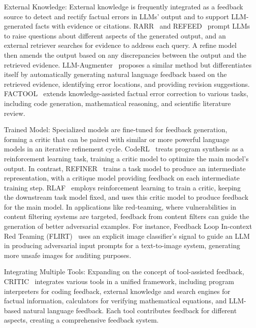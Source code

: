 \documentclass[12pt]{extarticle}
\begin{document}
External Knowledge: External knowledge is frequently integrated as a feedback source to detect and rectify factual errors in LLMs' output and to support LLM-generated facts with evidence or citations. RARR~\cite{gao2023rarr} and REFEED~\cite{yu2023improving} prompt LLMs to raise questions about different aspects of the generated output, and an external retriever searches for evidence to address each query. A refine model then amends the output based on any discrepancies between the output and the retrieved evidence. LLM-Augmenter~\cite{peng2023check} proposes a similar method but differentiates itself by automatically generating natural language feedback based on the retrieved evidence, identifying error locations, and providing revision suggestions. FACTOOL~\cite{chern2023factool} extends knowledge-assisted factual error correction to various tasks, including code generation, mathematical reasoning, and scientific literature review.

Trained Model: Specialized models are fine-tuned for feedback generation, forming a critic that can be paired with similar or more powerful language models in an iterative refinement cycle. CodeRL~\cite{le2022coderl} treats program synthesis as a reinforcement learning task, training a critic model to optimize the main model's output. In contrast, REFINER~\cite{paul2023refiner} trains a task model to produce an intermediate representation, with a critique model providing feedback on each intermediate training step. RLAF~\cite{akyurek-etal-2023-rl4f} employs reinforcement learning to train a critic, keeping the downstream task model fixed, and uses this critic model to produce feedback for the main model. In applications like red-teaming, where vulnerabilities in content filtering systems are targeted, feedback from content filters can guide the generation of better adversarial examples. For instance, Feedback Loop In-context Red Teaming (FLIRT)~\cite{mehrabi2023flirt} uses an explicit image classifier's signal to guide an LLM in producing adversarial input prompts for a text-to-image system, generating more unsafe images for auditing purposes.

Integrating Multiple Tools: Expanding on the concept of tool-assisted feedback, CRITIC~\cite{gou2023critic} integrates various tools in a unified framework, including program interpreters for coding feedback, external knowledge and search engines for factual information, calculators for verifying mathematical equations, and LLM-based natural language feedback. Each tool contributes feedback for different aspects, creating a comprehensive feedback system.
\end{document}
